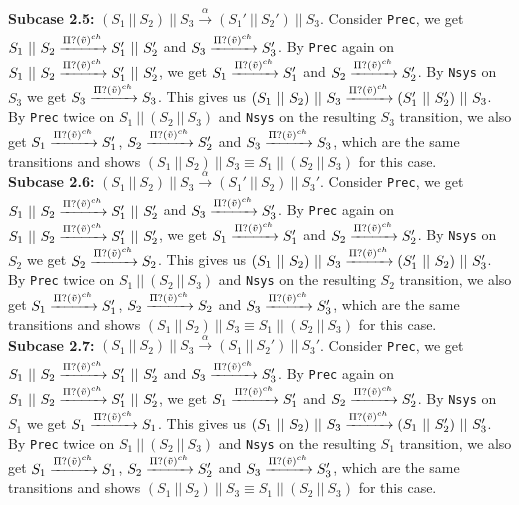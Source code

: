 \indent \textbf{Subcase 2.5: }$(S_1 \ || \ S_2)\ ||\ S_3 \xrightarrow[]{\alpha} (S_1' \ || \ S_2')\ ||\ S_3$. Consider \texttt{Prec}, we get $S_1 \ || \ S_2 \xrightarrow[]{\Pi ? (\Tilde{v})^{ch}} S_1' \ || \ S_2'$ and $S_3 \xrightarrow[]{\Pi ? (\Tilde{v})^{ch}} S_3'$. By \texttt{Prec} again on $S_1 \ || \ S_2 \xrightarrow[]{\Pi ? (\Tilde{v})^{ch}} S_1' \ || \ S_2'$, we get $S_1 \xrightarrow[]{\Pi ? (\Tilde{v})^{ch}} S_1'$ and $S_2 \xrightarrow[]{\Pi ? (\Tilde{v})^{ch}} S_2'$. By \texttt{Nsys} on $S_3$ we get $S_3 \xrightarrow[]{\Pi ? (\Tilde{v})^{ch}} S_3$. This gives us $(S_1 \ || \ S_2)\ ||\ S_3 \xrightarrow[]{\Pi ? (\Tilde{v})^{ch}} (S_1' \ || \ S_2')\ ||\ S_3$. By \texttt{Prec} twice on $S_1 \ ||\ (S_2 \ || \ S_3)$ and \texttt{Nsys} on the resulting $S_3$ transition, we also get $S_1 \xrightarrow[]{\Pi ? (\Tilde{v})^{ch}} S_1'$, $S_2 \xrightarrow[]{\Pi ? (\Tilde{v})^{ch}} S_2'$ and $S_3 \xrightarrow[]{\Pi ? (\Tilde{v})^{ch}} S_3$, which are the same transitions and shows $(S_1 \ ||\ S_2 )\ || \ S_3 \equiv S_1 \ ||\ (S_2 \ || \ S_3)$ for this case.\\
\indent \textbf{Subcase 2.6: }$(S_1 \ || \ S_2)\ ||\ S_3 \xrightarrow[]{\alpha} (S_1' \ || \ S_2)\ ||\ S_3'$. Consider \texttt{Prec}, we get $S_1 \ || \ S_2 \xrightarrow[]{\Pi ? (\Tilde{v})^{ch}} S_1' \ || \ S_2'$ and $S_3 \xrightarrow[]{\Pi ? (\Tilde{v})^{ch}} S_3'$. By \texttt{Prec} again on $S_1 \ || \ S_2 \xrightarrow[]{\Pi ? (\Tilde{v})^{ch}} S_1' \ || \ S_2'$, we get $S_1 \xrightarrow[]{\Pi ? (\Tilde{v})^{ch}} S_1'$ and $S_2 \xrightarrow[]{\Pi ? (\Tilde{v})^{ch}} S_2'$. By \texttt{Nsys} on $S_2$ we get $S_2 \xrightarrow[]{\Pi ? (\Tilde{v})^{ch}} S_2$. This gives us $(S_1 \ || \ S_2)\ ||\ S_3 \xrightarrow[]{\Pi ? (\Tilde{v})^{ch}} (S_1' \ || \ S_2)\ ||\ S_3'$. By \texttt{Prec} twice on $S_1 \ ||\ (S_2 \ || \ S_3)$ and \texttt{Nsys} on the resulting $S_2$ transition, we also get $S_1 \xrightarrow[]{\Pi ? (\Tilde{v})^{ch}} S_1'$, $S_2 \xrightarrow[]{\Pi ? (\Tilde{v})^{ch}} S_2$ and $S_3 \xrightarrow[]{\Pi ? (\Tilde{v})^{ch}} S_3'$, which are the same transitions and shows $(S_1 \ ||\ S_2 )\ || \ S_3 \equiv S_1 \ ||\ (S_2 \ || \ S_3)$ for this case.\\
\indent \textbf{Subcase 2.7: }$(S_1 \ || \ S_2)\ ||\ S_3 \xrightarrow[]{\alpha} (S_1 \ || \ S_2')\ ||\ S_3'$. Consider \texttt{Prec}, we get $S_1 \ || \ S_2 \xrightarrow[]{\Pi ? (\Tilde{v})^{ch}} S_1' \ || \ S_2'$ and $S_3 \xrightarrow[]{\Pi ? (\Tilde{v})^{ch}} S_3'$. By \texttt{Prec} again on $S_1 \ || \ S_2 \xrightarrow[]{\Pi ? (\Tilde{v})^{ch}} S_1' \ || \ S_2'$, we get $S_1 \xrightarrow[]{\Pi ? (\Tilde{v})^{ch}} S_1'$ and $S_2 \xrightarrow[]{\Pi ? (\Tilde{v})^{ch}} S_2'$. By \texttt{Nsys} on $S_1$ we get $S_1 \xrightarrow[]{\Pi ? (\Tilde{v})^{ch}} S_1$. This gives us $(S_1 \ || \ S_2)\ ||\ S_3 \xrightarrow[]{\Pi ? (\Tilde{v})^{ch}} (S_1 \ || \ S_2')\ ||\ S_3'$. By \texttt{Prec} twice on $S_1 \ ||\ (S_2 \ || \ S_3)$ and \texttt{Nsys} on the resulting $S_1$ transition, we also get $S_1 \xrightarrow[]{\Pi ? (\Tilde{v})^{ch}} S_1$, $S_2 \xrightarrow[]{\Pi ? (\Tilde{v})^{ch}} S_2'$ and $S_3 \xrightarrow[]{\Pi ? (\Tilde{v})^{ch}} S_3'$, which are the same transitions and shows $(S_1 \ ||\ S_2 )\ || \ S_3 \equiv S_1 \ ||\ (S_2 \ || \ S_3)$ for this case.\\
